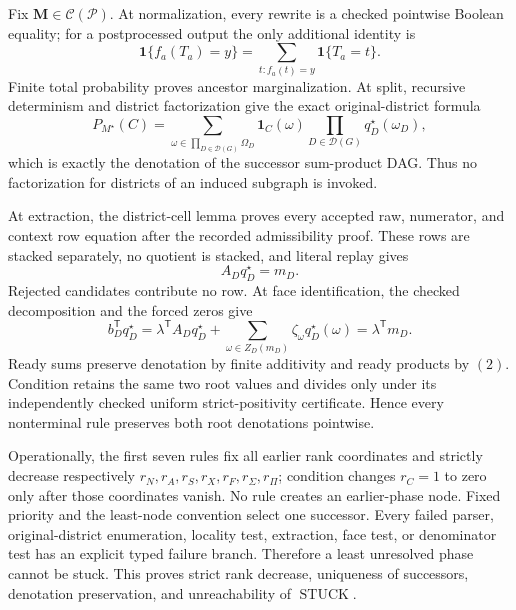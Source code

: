 Fix \(\mathbf M\in\mathcal C(\mathcal P)\).  At normalization, every rewrite is a checked pointwise Boolean equality; for a postprocessed output the only additional identity is
\[
\mathbf 1\{f_a(T_a)=y\}
=\sum_{t:f_a(t)=y}\mathbf 1\{T_a=t\}.
\tag{1}
\]
Finite total probability proves ancestor marginalization.  At split, recursive determinism and district factorization give the exact original-district formula
\[
P_{M^\star}(C)=
\sum_{\omega\in\prod_{D\in\mathcal D(G)}\Omega_D}
\mathbf 1_C(\omega)
\prod_{D\in\mathcal D(G)}q_D^\star(\omega_D),
\tag{2}
\]
which is exactly the denotation of the successor sum-product DAG.  Thus no factorization for districts of an induced subgraph is invoked.

At extraction, the district-cell lemma proves every accepted raw, numerator, and context row equation after the recorded admissibility proof.  These rows are stacked separately, no quotient is stacked, and literal replay gives
\[
A_Dq_D^\star=m_D.
\tag{3}
\]
Rejected candidates contribute no row.  At face identification, the checked decomposition and the forced zeros give
\[
b_D^{\mathsf T}q_D^\star
=\lambda^{\mathsf T}A_Dq_D^\star
+\sum_{\omega\in Z_D(m_D)}\zeta_\omega q_D^\star(\omega)
=\lambda^{\mathsf T}m_D.
\tag{4}
\]
Ready sums preserve denotation by finite additivity and ready products by \((2)\).  Condition retains the same two root values and divides only under its independently checked uniform strict-positivity certificate.  Hence every nonterminal rule preserves both root denotations pointwise.

Operationally, the first seven rules fix all earlier rank coordinates and strictly decrease respectively \(r_N,r_A,r_S,r_X,r_F,r_\Sigma,r_\Pi\); condition changes \(r_C=1\) to zero only after those coordinates vanish.  No rule creates an earlier-phase node.  Fixed priority and the least-node convention select one successor.  Every failed parser, original-district enumeration, locality test, extraction, face test, or denominator test has an explicit typed failure branch.  Therefore a least unresolved phase cannot be stuck.  This proves strict rank decrease, uniqueness of successors, denotation preservation, and unreachability of \(\operatorname{STUCK}\).